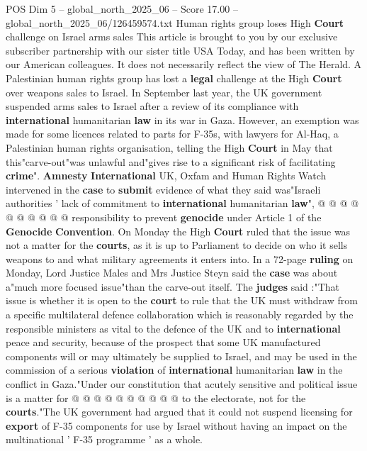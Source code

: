 \begin{textsample}{POS Dim 5 – global\_north\_2025\_06 – Score 17.00 – global\_north\_2025\_06/126459574.txt}  \label{ex:f5_pos_083}
Human rights group loses High \textbf{Court} challenge on Israel arms sales This article is brought to you by our exclusive subscriber partnership with our sister title USA Today, and has been written by our American colleagues.
It does not necessarily reflect the view of The Herald.
A Palestinian human rights group has lost a \textbf{legal} challenge at the High \textbf{Court} over weapons sales to Israel.
In September last year, the UK government suspended arms sales to Israel after a review of its compliance with \textbf{international} humanitarian \textbf{law} in its war in Gaza.
However, an exemption was made for some licences related to parts for F-35s, with lawyers for Al-Haq, a Palestinian human rights organisation, telling the High \textbf{Court} in May that this"carve-out"was unlawful and"gives rise to a significant risk of facilitating \textbf{crime}". \textbf{Amnesty} \textbf{International} UK, Oxfam and Human Rights Watch intervened in the \textbf{case} to \textbf{submit} evidence of what they said was"Israeli authorities ' lack of commitment to \textbf{international} humanitarian \textbf{law}", @ @ @ @ @ @ @ @ @ @ responsibility to prevent \textbf{genocide} under Article 1 of the \textbf{Genocide} \textbf{Convention}.
On Monday the High \textbf{Court} ruled that the issue was not a matter for the \textbf{courts}, as it is up to Parliament to decide on who it sells weapons to and what military agreements it enters into.
In a 72-page \textbf{ruling} on Monday, Lord Justice Males and Mrs Justice Steyn said the \textbf{case} was about a"much more focused issue"than the carve-out itself.
The \textbf{judges} said :"That issue is whether it is open to the \textbf{court} to rule that the UK must withdraw from a specific multilateral defence collaboration which is reasonably regarded by the responsible ministers as vital to the defence of the UK and to \textbf{international} peace and security, because of the prospect that some UK manufactured components will or may ultimately be supplied to Israel, and may be used in the commission of a serious \textbf{violation} of \textbf{international} humanitarian \textbf{law} in the conflict in Gaza."Under our constitution that acutely sensitive and political issue is a matter for @ @ @ @ @ @ @ @ @ @ to the electorate, not for the \textbf{courts}."The UK government had argued that it could not suspend licensing for \textbf{export} of F-35 components for use by Israel without having an impact on the multinational ' F-35 programme ' as a whole.

\end{textsample}
